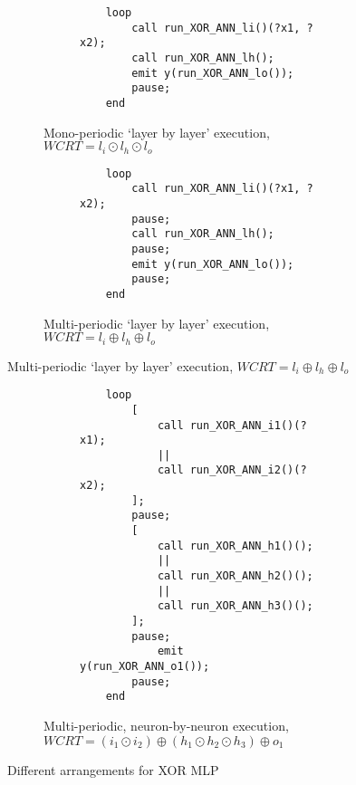\begin{figure}[h]
	\centering
	\begin{subfigure}[h]{0.6\textwidth}
		\centering
		\begin{subfigure}[h]{0.3\textwidth}
			\centering
			
		\end{subfigure}%
		\begin{subfigure}[h]{0.66\textwidth}
			\vspace{3mm}
			\begin{lstlisting}
	loop
		call run_XOR_ANN_li()(?x1, ?x2);
		call run_XOR_ANN_lh();
		emit y(run_XOR_ANN_lo());
		pause;
	end
			\end{lstlisting}
		\end{subfigure}
		\caption{Mono-periodic `layer by layer' execution, $WCRT = l_i \odot l_h \odot l_o$}
		\label{fig:tca-bb}
	\end{subfigure}
	
	\vspace{5mm}
	\begin{subfigure}[h]{0.5\textwidth}
		\centering
		\begin{subfigure}[h]{0.3\textwidth}
			\centering
			
		\end{subfigure}%
		\begin{subfigure}[h]{0.66\textwidth}
		\begin{lstlisting}
	loop
		call run_XOR_ANN_li()(?x1, ?x2);
		pause;
		call run_XOR_ANN_lh();
		pause;
		emit y(run_XOR_ANN_lo());
		pause;
	end
		\end{lstlisting}
		\end{subfigure}
		\caption{Multi-periodic `layer by layer' execution, $WCRT = l_i \oplus l_h \oplus l_o$}
		\label{fig:tca-layers}
	\end{subfigure}
	\end{figure}
	
	\begin{figure}[h]
		\centering
	\vspace{5mm}
	\begin{subfigure}[h]{0.8\textwidth}
		\centering
		\begin{subfigure}[h]{0.3\textwidth}
			\centering
			
		\end{subfigure}%
		\begin{subfigure}[h]{0.66\textwidth}
			\begin{lstlisting}
	loop
		[
			call run_XOR_ANN_i1()(?x1);
			|| 
			call run_XOR_ANN_i2()(?x2);
		];
		pause;
		[
			call run_XOR_ANN_h1()();
			||
			call run_XOR_ANN_h2()();
			||
			call run_XOR_ANN_h3()();
		];
		pause;
			emit y(run_XOR_ANN_o1());
		pause;
	end
			\end{lstlisting}
		\end{subfigure}
		\caption{Multi-periodic, neuron-by-neuron execution, $WCRT = \left(i_1 \odot i_2\right) \oplus \left(h_1 \odot h_2 \odot h_3\right) \oplus o_1$}
		\label{fig:tca-neurons}
	\end{subfigure}
\caption{Different arrangements for XOR \ac{MLP}}
\label{fig:tcas-xor}
\end{figure}